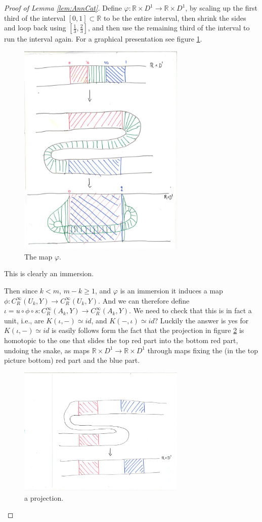 \documentclass{article}
\newtheorem{proposed work}[theorem]{Proposed Work}
\begin{document}
\begin{proof}[Proof of Lemma \ref{lem:AnnCat}]
Define $\varphi: \mathbb{R}\times D^1 \to \mathbb{R}\times D^1$, by scaling up the first third of the interval $[0,1]\subset \mathbb{R}$ to be the entire interval, then shrink the sides and loop back using $[\frac{1}{3},\frac{2}{3}]$, and then use the remaining third of the interval to run the interval again. For a graphical presentation see figure \ref{themapphi}.
\begin{figure}[h] 
\includegraphics[width=8cm]{TheMapphi.pdf}
\caption{ \label{themapphi} The map $\varphi$.}
\end{figure}
 This is clearly an immersion. 

Then since $k<m$, $m-k\geq 1$, and $\varphi$ is an immersion it induces a map $\phi: C^\infty_R(U_k,Y)\to C^\infty_R(U_k,Y)$. And we can therefore define $\iota=u\circ \phi \circ s: C^\infty_R(A_k,Y)\to C^\infty_R(A_k,Y)$. We need to check that this is in fact a unit, i.e., are $K(\iota,-)\simeq id$, and $K(-,\iota)\simeq id$? Luckily the answer is yes for $K(\iota,-)\simeq id$ is easily follows form the fact that the projection in figure \ref{snakeundo} is homotopic to the one that slides the top red part into the bottom red part, undoing the snake, as maps $\mathbb{R}\times D^1\to \mathbb{R}\times D^1$ through maps fixing the (in the top picture bottom) red part and the blue part.
\begin{figure}[h] 
\includegraphics[width=8cm]{Snakeundo.pdf}
\caption{ \label{snakeundo} a projection.}
\end{figure}

\end{proof}

\printbibliography
\end{document}

